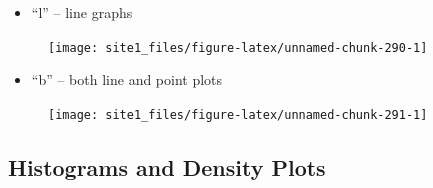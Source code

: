 \documentclass[]{book}
\newenvironment{Shaded}{\begin{snugshade}}{\end{snugshade}}
\newcommand{\KeywordTok}[1]{\textcolor[rgb]{0.13,0.29,0.53}{\textbf{#1}}}
\newcommand{\DataTypeTok}[1]{\textcolor[rgb]{0.13,0.29,0.53}{#1}}
\newcommand{\StringTok}[1]{\textcolor[rgb]{0.31,0.60,0.02}{#1}}
\newcommand{\CommentTok}[1]{\textcolor[rgb]{0.56,0.35,0.01}{\textit{#1}}}
\newcommand{\OperatorTok}[1]{\textcolor[rgb]{0.81,0.36,0.00}{\textbf{#1}}}
\newcommand{\NormalTok}[1]{#1}
\providecommand{\tightlist}{%
  \setlength{\itemsep}{0pt}\setlength{\parskip}{0pt}}
\begin{document}
\begin{itemize}
\tightlist
\item
  ``l'' -- line graphs
\end{itemize}

\begin{Shaded}
\end{Shaded}

\begin{figure}

{\centering \texttt{[image: site1\_files/figure-latex/unnamed-chunk-290-1]} 

}

\caption{ }\label{fig:unnamed-chunk-290}
\end{figure}

\begin{itemize}
\tightlist
\item
  ``b'' -- both line and point plots
\end{itemize}

\begin{Shaded}
\end{Shaded}

\begin{figure}

{\centering \texttt{[image: site1\_files/figure-latex/unnamed-chunk-291-1]} 

}

\caption{ }\label{fig:unnamed-chunk-291}
\end{figure}

\subsection{Histograms and Density
Plots}\label{histograms-and-density-plots}
\end{document}
